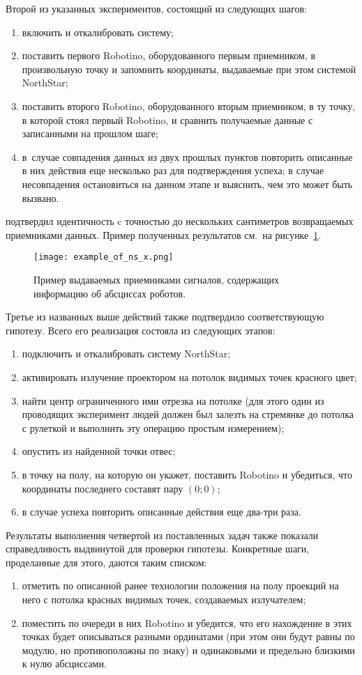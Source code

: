 Второй из указанных экспериментов, состоящий из следующих шагов:
\begin{enumerate}
	\item включить и откалибровать систему;
	\item поставить первого Robotino, оборудованного первым приемником, в произвольную точку и запомнить координаты, выдаваемые при этом системой NorthStar;
	\item поставить  второго Robotino, оборудованного вторым приемником, в ту точку, в которой стоял первый Robotino, и сравнить получаемые данные с записанными на прошлом шаге;
	\item в~случае совпадения данных из двух прошлых пунктов повторить описанные в них действия еще несколько раз для подтверждения успеха; в случае несовпадения остановиться на данном этапе и выяснить, чем это может быть вызвано.
\end{enumerate}
подтвердил идентичность c точностью до нескольких сантиметров возвращаемых приемниками данных.
Пример полученных результатов см.~на рисунке~\ref{img_sameless_exps}.

\begin{figure}[h!]
	\centering
	\texttt{[image: example\_of\_ns\_x.png]}
	\caption{Пример выдаваемых приемниками сигналов, содержащих информацию об абсциссах роботов.}
	\label{img_sameless_exps}
\end{figure}

Третье из названных выше действий также подтвердило соответствующую гипотезу.
Всего его реализация состояла из следующих этапов:
\begin{enumerate}
	\item подключить и откалибровать систему NorthStar;
	\item активировать излучение проектором на потолок видимых точек красного цвет;
	\item найти центр ограниченного ими отрезка на потолке (для этого один из проводящих эксперимент людей должен был залезть на стремянке до потолка с рулеткой и выполнить эту операцию простым измерением);
	\item опустить из найденной точки отвес;
	\item в точку на полу, на которую он укажет, поставить Robotino и убедиться, что координаты последнего составят пару $(0; 0)$;
	\item в случае успеха повторить описанные действия еще два-три раза.
\end{enumerate}

Результаты выполнения четвертой из поставленных задач также показали справедливость выдвинутой для проверки гипотезы.
Конкретные шаги, проделанные для этого, даются таким списком:
\begin{enumerate}
	\item отметить по описанной ранее технологии положения на полу проекций на него с потолка красных видимых точек, создаваемых излучателем;
	\item поместить по очереди в них Robotino и убедится, что его нахождение в этих точках будет описываться разными ординатами (при этом они будут равны по модулю, но противоположны по знаку) и одинаковыми и предельно близкими к нулю абсциссами.
\end{enumerate}

